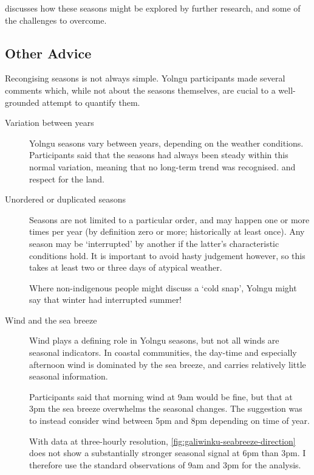  discusses how these seasons might be explored
by further research, and some of the challenges to overcome.



\subsection{Other Advice}
\label{subsec:detection-advice}

Recongising seasons is not always simple.  Yolngu participants made
several comments which, while not about the seasons themselves, are
cucial to a well-grounded attempt to quantify them.

\begin{description}
\item[Variation between years]
    Yolngu seasons vary between years, depending on the weather conditions.
    Participants said that the seasons had always been steady within this
    normal variation, meaning that no long-term trend was recognised.
    and respect for the land.

\item[Unordered or duplicated seasons]
    Seasons are not limited to a particular order, and may happen one or more
    times per year (by definition zero or more; historically at least once).
    Any season may be `interrupted' by another if the latter's characteristic
    conditions hold.  It is important to avoid hasty judgement however, so this
    takes at least two or three days of atypical weather.

    Where non-indigenous people might discuss a `cold snap', Yolngu might
    say that winter had interrupted summer!

\item[Wind and the sea breeze]
    Wind plays a defining role in Yolngu seasons, but not all winds are
    seasonal indicators.  In coastal communities, the day-time and especially
    afternoon wind is dominated by the sea breeze, and carries relatively little
    seasonal information.

    Participants said that morning wind at 9am would be fine, but that at
    3pm the sea breeze overwhelms the seasonal changes.  The suggestion was
    to instead consider wind between 5pm and 8pm depending on time of year.

    With data at three-hourly resolution, \cref{fig:galiwinku-seabreeze-direction}
    does not show a substantially stronger seasonal signal at 6pm than 3pm.
    I therefore use the standard observations of 9am and 3pm for the analysis.
\end{description}

